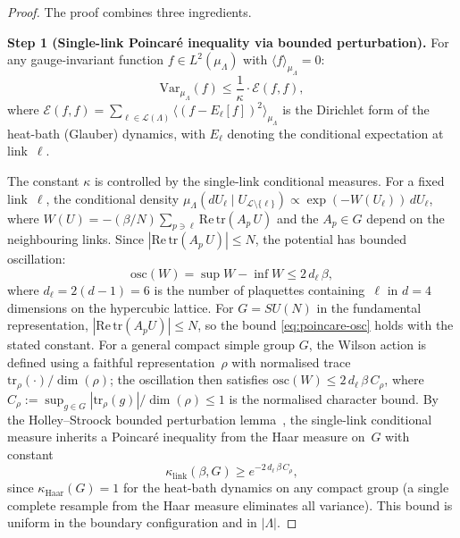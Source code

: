 \documentclass[12pt,a4paper]{article}
\theoremstyle{definition}
\theoremstyle{plain}
\theoremstyle{remark}
\begin{document}
\begin{proof}
The proof combines three ingredients.

\medskip
\noindent\textbf{Step 1 (Single-link Poincar\'e inequality via bounded perturbation).}
For any gauge-invariant function $f \in L^2(\mu_\Lambda)$ with $\langle f \rangle_{\mu_\Lambda} = 0$:
\begin{equation}\label{eq:poincare}
    \mathrm{Var}_{\mu_\Lambda}(f) \leq \frac{1}{\kappa} \cdot \mathcal{E}(f, f),
\end{equation}
where $\mathcal{E}(f,f) = \sum_{\ell \in \mathcal{L}(\Lambda)} \langle (f - E_\ell[f])^2 \rangle_{\mu_\Lambda}$ is the Dirichlet form of the heat-bath (Glauber) dynamics, with $E_\ell$ denoting the conditional expectation at link~$\ell$.

The constant $\kappa$ is controlled by the single-link conditional measures. For a fixed link~$\ell$, the conditional density $\mu_\Lambda(dU_\ell \mid U_{\mathcal{L}\setminus\{\ell\}}) \propto \exp(-W(U_\ell))\,dU_\ell$, where $W(U) = -(\beta/N)\sum_{p \ni \ell} \mathrm{Re}\,\mathrm{tr}(A_p\,U)$ and the $A_p \in G$ depend on the neighbouring links. Since $|\mathrm{Re}\,\mathrm{tr}(A_p\,U)| \leq N$, the potential has bounded oscillation:
\begin{equation}\label{eq:poincare-osc}
    \mathrm{osc}(W) = \sup W - \inf W \leq 2\,d_\ell\,\beta,
\end{equation}
where $d_\ell = 2(d-1) = 6$ is the number of plaquettes containing~$\ell$ in $d=4$ dimensions on the hypercubic lattice. For $G = SU(N)$ in the fundamental representation, $|\mathrm{Re}\,\mathrm{tr}(A_p U)| \leq N$, so the bound \eqref{eq:poincare-osc} holds with the stated constant. For a general compact simple group $G$, the Wilson action is defined using a faithful representation~$\rho$ with normalised trace $\mathrm{tr}_\rho(\cdot)/\dim(\rho)$; the oscillation then satisfies $\mathrm{osc}(W) \leq 2\,d_\ell\,\beta\,C_\rho$, where $C_\rho := \sup_{g \in G} |\mathrm{tr}_\rho(g)|/\dim(\rho) \leq 1$ is the normalised character bound. By the Holley--Stroock bounded perturbation lemma~\cite{HolleyStroock1987}, the single-link conditional measure inherits a Poincar\'e inequality from the Haar measure on~$G$ with constant
\begin{equation}\label{eq:single-link-gap}
    \kappa_{\mathrm{link}}(\beta, G) \geq e^{-2\,d_\ell\,\beta\,C_\rho},
\end{equation}
since $\kappa_{\mathrm{Haar}}(G) = 1$ for the heat-bath dynamics on any compact group (a single complete resample from the Haar measure eliminates all variance). This bound is uniform in the boundary configuration and in $|\Lambda|$.


\end{proof}
\end{document}

